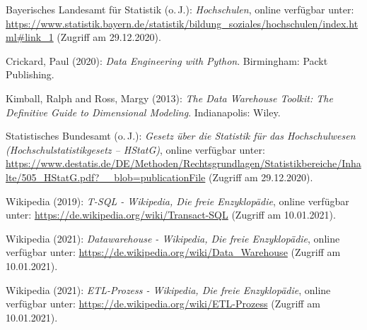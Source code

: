 

\begin{thebibliography}{9}
\singlespacing%

%
Bayerisches Landesamt für Statistik (o.\,J.): \emph{Hochschulen}, online verfügbar unter: \url{https://www.statistik.bayern.de/statistik/bildung_soziales/hochschulen/index.html#link_1} (Zugriff am 29.12.2020).%

%
Crickard, Paul (2020): \emph{Data Engineering with Python}. Birmingham: Packt Publishing.%

%
Kimball, Ralph and Ross, Margy (2013): \emph{The Data Warehouse Toolkit: The Definitive Guide to Dimensional Modeling}. Indianapolis: Wiley.%

Statistisches Bundesamt (o.\,J.): \emph{Gesetz über die Statistik für das Hochschulwesen (Hochschulstatistikgesetz – HStatG)}, online verfügbar unter: \url{https://www.destatis.de/DE/Methoden/Rechtsgrundlagen/Statistikbereiche/Inhalte/505_HStatG.pdf?__blob=publicationFile} (Zugriff am 29.12.2020).

%
Wikipedia (2019): \emph{T-SQL - Wikipedia, Die freie Enzyklopädie}, online verfügbar unter: \url{https://de.wikipedia.org/wiki/Transact-SQL} (Zugriff am 10.01.2021).%

%
Wikipedia (2021): \emph{Datawarehouse - Wikipedia, Die freie Enzyklopädie}, online verfügbar unter: \url{https://de.wikipedia.org/wiki/Data_Warehouse} (Zugriff am 10.01.2021).%

%
Wikipedia (2021): \emph{ETL-Prozess - Wikipedia, Die freie Enzyklopädie}, online verfügbar unter: \url{https://de.wikipedia.org/wiki/ETL-Prozess} (Zugriff am 10.01.2021).%





\end{thebibliography}%

\newpage%


